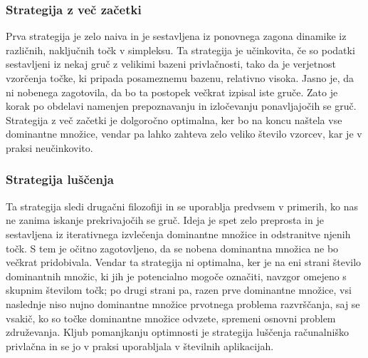 \documentclass[a4paper]{article}
\begin{document}
\subsubsection{Strategija z več začetki} Prva strategija je zelo naiva in je sestavljena iz ponovnega zagona dinamike iz različnih, naključnih točk v simpleksu. Ta strategija je učinkovita, če so podatki sestavljeni iz nekaj gruč z velikimi bazeni privlačnosti, tako da je verjetnost vzorčenja točke, ki pripada posameznemu bazenu, relativno visoka. Jasno je, da ni nobenega zagotovila, da bo ta postopek večkrat izpisal iste gruče. Zato je korak po obdelavi namenjen prepoznavanju in izločevanju ponavljajočih se gruč. Strategija z več začetki je dolgoročno optimalna, ker bo na koncu naštela vse dominantne množice, vendar pa lahko zahteva zelo veliko število vzorcev, kar je v praksi neučinkovito.

\subsubsection{Strategija luščenja} Ta strategija sledi drugačni filozofiji in se uporablja predvsem v primerih, ko nas ne zanima iskanje prekrivajočih se gruč. Ideja je spet zelo preprosta in je sestavljena iz iterativnega izvlečenja dominantne množice in odstranitve njenih točk. S tem je očitno zagotovljeno, da se nobena dominantna množica ne bo večkrat pridobivala. Vendar ta strategija ni optimalna, ker je na eni strani število dominantnih množic, ki jih je potencialno mogoče označiti, navzgor omejeno s skupnim številom točk; po drugi strani pa, razen prve dominantne množice, vsi naslednje niso nujno dominantne množice prvotnega problema razvrščanja, saj se vsakič, ko so točke dominantne množice odvzete, spremeni osnovni problem združevanja. Kljub pomanjkanju optimnosti je strategija luščenja računalniško privlačna in se jo v praksi uporabljala v številnih aplikacijah.








\end{document}
